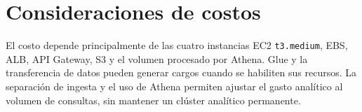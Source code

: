 \chapter{Consideraciones de costos}
El costo depende principalmente de las cuatro instancias EC2 \texttt{t3.medium}, EBS, ALB, API Gateway, S3 y el volumen procesado por Athena. Glue y la transferencia de datos pueden generar cargos cuando se habiliten sus recursos. La separación de ingesta y el uso de Athena permiten ajustar el gasto analítico al volumen de consultas, sin mantener un clúster analítico permanente.

